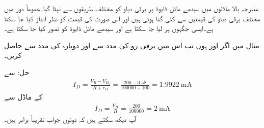 
مندرجہ بالا ماڈلوں میں سیدھے مائل ڈایوڈ پر برقی دباو  کو مختلف طریقوں سے نپٹا گیا۔عموماً دور میں مختلف برقی دباو کی قیمتیں  سے کئی گنا ہوتی ہیں اور اس صورت  کی قیمت کو نظر انداز کیا جا سکتا ہے۔ایسی جگہوں پر  لیا جا سکتا ہے اور سیدھے مائل ڈایوڈ کو   تصور کیا جا سکتا ہے۔

مثال   میں اگر  اور  ہوں تب اس میں برقی رو  کی مدد سے اور دوبارہ  کی مدد سے حاصل کریں۔

حل:  سے
\begin{align*}
I_D=\frac{V_B-V_{D_0}}{R+r_D}=\frac{200-0.58}{100000+100}=\SI{1.9922}{\milli \ampere}
\end{align*}
 کے ماڈل سے
\begin{align*}
I_D=\frac{V_B}{R}=\frac{200}{100000}=\SI{2}{\milli \ampere}
\end{align*}
آپ دیکھ سکتے ہیں کہ دونوں جواب تقریباً برابر ہیں۔


